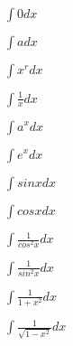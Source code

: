 \documentclass{article}
\begin{document}
$
\int 0 dx
$

$
\int a dx
$

$
\int x^r dx
$

$
\int \frac{1}{x} dx
$

$
\int a^x dx
$

$
\int e^x dx
$

$
\int sin x dx
$

$
\int cos x dx
$

$
\int \frac{1}{cos^2 x} dx
$

$
\int \frac{1}{sin^2 x} dx
$

$
\int \frac{1}{1+x^2} dx
$

$
\int \frac{1}{\sqrt{1-x^2}} dx
$
\end{document}
